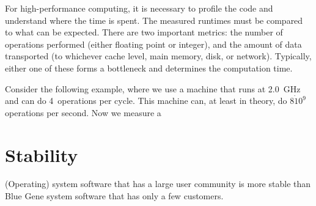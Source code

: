 \documentclass[article]{sig-alternate}
\begin{document}
For high-performance computing, it is necessary to profile the code and
understand where the time is spent.
The measured runtimes must be compared to what can be expected.
There are two important metrics: the number of operations performed (either
floating point or integer), and the amount of data transported (to whichever
cache level, main memory, disk, or network).
Typically, either one of these forms a bottleneck and determines the
computation time.

Consider the following example, where we use a machine that runs at 2.0~GHz
and can do 4~operations per cycle.
This machine can, at least in theory, do $8 \dot 10^9$ operations per second.
Now we measure a 


\section{Stability}

(Operating) system software that has a large user community is more stable
than Blue Gene system software that has only a few customers.




\end{document}
